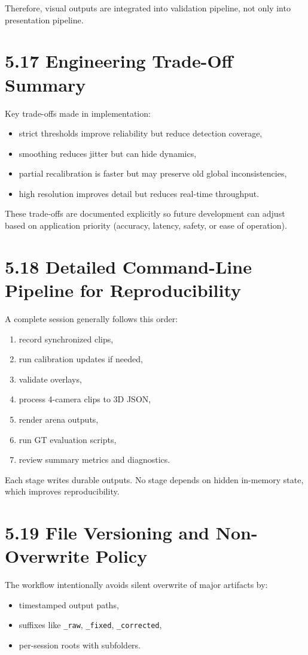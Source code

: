 Therefore, visual outputs are integrated into validation pipeline, not only into presentation pipeline.

\section{5.17 Engineering Trade-Off Summary}
Key trade-offs made in implementation:
\begin{itemize}
  \item strict thresholds improve reliability but reduce detection coverage,
  \item smoothing reduces jitter but can hide dynamics,
  \item partial recalibration is faster but may preserve old global inconsistencies,
  \item high resolution improves detail but reduces real-time throughput.
\end{itemize}

These trade-offs are documented explicitly so future development can adjust based on application priority (accuracy, latency, safety, or ease of operation).



\section{5.18 Detailed Command-Line Pipeline for Reproducibility}
A complete session generally follows this order:
\begin{enumerate}
  \item record synchronized clips,
  \item run calibration updates if needed,
  \item validate overlays,
  \item process 4-camera clips to 3D JSON,
  \item render arena outputs,
  \item run GT evaluation scripts,
  \item review summary metrics and diagnostics.
\end{enumerate}

Each stage writes durable outputs. No stage depends on hidden in-memory state, which improves reproducibility.

\section{5.19 File Versioning and Non-Overwrite Policy}
The workflow intentionally avoids silent overwrite of major artifacts by:
\begin{itemize}
  \item timestamped output paths,
  \item suffixes like \texttt{\_raw}, \texttt{\_fixed}, \texttt{\_corrected},
  \item per-session roots with subfolders.
\end{itemize}

